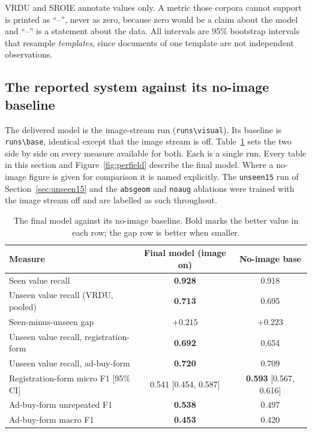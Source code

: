 \documentclass[11pt,a4paper]{article}
\newcommand{\code}[1]{\texttt{\small #1}}
\begin{document}
VRDU and SROIE annotate values only. A metric those corpora cannot support is printed as
``--'', never as zero, because zero would be a claim about the model and ``--'' is a statement
about the data. All intervals are 95\% bootstrap intervals that resample \emph{templates}, since
documents of one template are not independent observations.

\subsection{The reported system against its no-image baseline}
\label{sec:reported}

The delivered model is the image-stream run (\code{runs\textbackslash visual}). Its baseline is
\code{runs\textbackslash base}, identical except that the image stream is off.
Table~\ref{tab:final} sets the two side by side on every measure available for both. Each is a
single run. Every table in this section and Figure~\ref{fig:perfield} describe the final model.
Where a no-image figure is given for comparison it is named explicitly. The \code{unseen15} run of
Section~\ref{sec:unseen15} and the \code{absgeom} and \code{noaug} ablations were trained with the
image stream off and are labelled as such throughout.

\begin{table}[htbp]
\centering\small
\begin{tabular}{@{}lcc@{}}
\toprule
\textbf{Measure} & \textbf{Final model (image on)} & \textbf{No-image base} \\
\midrule
Seen value recall                          & \textbf{0.928} & 0.918 \\
Unseen value recall (VRDU, pooled)         & \textbf{0.713} & 0.695 \\
Seen-minus-unseen gap                      & $\mathbf{+0.215}$ & $+0.223$ \\
Unseen value recall, registration-form     & \textbf{0.692} & 0.654 \\
Unseen value recall, ad-buy-form           & \textbf{0.720} & 0.709 \\
Registration-form micro F1 [95\% CI]       & 0.541 [0.454, 0.587] & \textbf{0.593} [0.567, 0.616] \\
Ad-buy-form unrepeated F1                  & \textbf{0.538} & 0.497 \\
Ad-buy-form macro F1                       & \textbf{0.453} & 0.420 \\
\bottomrule
\end{tabular}
\caption{The final model against its no-image baseline. Bold marks the better value in each row;
the gap row is better when smaller.}
\label{tab:final}
\end{table}
\end{document}
